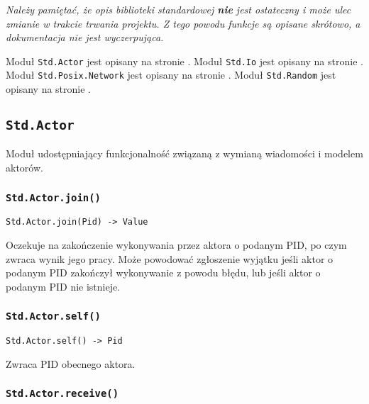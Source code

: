 \begin{center}
\emph{Należy pamiętać, że opis biblioteki standardowej \textbf{nie} jest ostateczny i może ulec zmianie w
trakcie trwania projektu. Z tego powodu funkcje są opisane skrótowo, a dokumentacja nie jest wyczerpująca.}
\end{center}

Moduł \texttt{Std.Actor} jest opisany na stronie \pageref{stdlib_Std_Actor}.
Moduł \texttt{Std.Io} jest opisany na stronie \pageref{stdlib_Std_Io}.
Moduł \texttt{Std.Posix.Network} jest opisany na stronie \pageref{stdlib_Std_Posix_Network}.
Moduł \texttt{Std.Random} jest opisany na stronie \pageref{stdlib_Std_Random}.

\subsection{\texttt{Std.Actor}}
\label{stdlib_Std_Actor}

Moduł udostępniający funkcjonalność związaną z wymianą wiadomości i modelem aktorów.

\subsubsection{\texttt{Std.Actor.join()}}
\label{Std_Actor_join}

\begin{small}
\begin{lstlisting}
Std.Actor.join(Pid) -> Value
\end{lstlisting}
\end{small}

Oczekuje na zakończenie wykonywania przez aktora o podanym PID, po czym zwraca wynik jego pracy.
Może powodować zgłoszenie wyjątku jeśli aktor o podanym PID zakończył wykonywanie z powodu błędu, lub jeśli aktor
o podanym PID nie istnieje.

\subsubsection{\texttt{Std.Actor.self()}}

\begin{small}
\begin{lstlisting}
Std.Actor.self() -> Pid
\end{lstlisting}
\end{small}

Zwraca PID obecnego aktora.

\subsubsection{\texttt{Std.Actor.receive()}}

